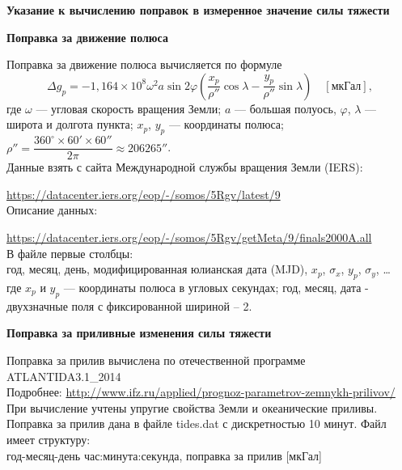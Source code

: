 \documentclass[11pt, a4paper,addpoints]{exam}
\theoremstyle{remark}
\renewcommand{\phi}{\ensuremath{\varphi}}
\begin{document}
\newpage
\thispagestyle{empty}
\begin{center}
    \textbf{Указание к вычислению поправок в измеренное значение силы тяжести}
\end{center}
\begin{flushleft}
    \textbf{Поправка за движение полюса} 
\end{flushleft}
Поправка за движение полюса вычисляется по формуле
    \begin{equation*}
            \Delta g_p = - 1,164\times 10^8 \omega^2 a \sin{2\phi} \left( \dfrac{x_p}{\rho''} \cos\lambda -
            \dfrac{y_p}{\rho''}\sin\lambda \right)\quad[\text{мкГал}],
        \end{equation*}
        где $\omega$ --- угловая скорость вращения Земли; $a$ --- большая полуось, $\phi$, $\lambda$ --- широта
        и долгота пункта; $x_p$, $y_p$ --- координаты полюса; $\rho'' = \dfrac{360^\circ \times 60'
        \times 60''}{2\pi} \approx 206265''$.\\
        Данные взять с сайта Международной службы вращения Земли (IERS):\par
        \url{https://datacenter.iers.org/eop/-/somos/5Rgv/latest/9}\\
        Описание данных:\par
        \url{https://datacenter.iers.org/eop/-/somos/5Rgv/getMeta/9/finals2000A.all} \\
        В файле первые столбцы:\\
        год, месяц, день, модифицированная юлианская дата (MJD), $x_p$, $\sigma_x$, $y_p$, $\sigma_y$, \dots\\ 
        где $x_p$ и  $y_p$ --- координаты полюса в угловых секундах; год, месяц, дата - двухзначные поля
        с фиксированной шириной -- 2. 
\begin{flushleft}
    \textbf{Поправка за приливные изменения силы тяжести} 
\end{flushleft}
Поправка за прилив вычислена по отечественной программе ATLANTIDA3.1\_2014 \\
Подробнее: \url{http://www.ifz.ru/applied/prognoz-parametrov-zemnykh-prilivov/}\\
При вычисление учтены упругие свойства Земли и океанические приливы.\\
Поправка за прилив дана в файле \textrm{tides.dat} с дискретностью 10 минут. Файл имеет структуру:\\
год-месяц-день час:минута:секунда, поправка за прилив [мкГал]\\
\end{document}
